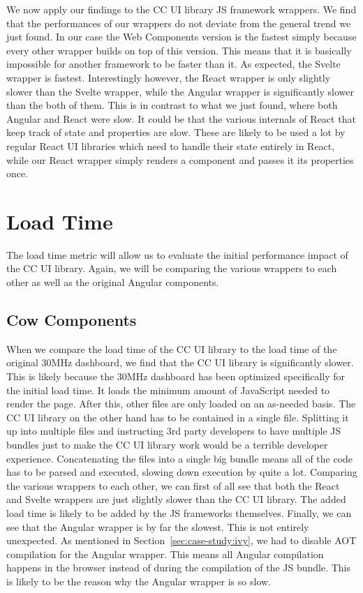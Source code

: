 We now apply our findings to the CC UI library JS framework wrappers. We find that the performances of our wrappers do not deviate from the general trend we just found. In our case the Web Components version is the fastest simply because every other wrapper builds on top of this version. This means that it is basically impossible for another framework to be faster than it. As expected, the Svelte wrapper is fastest. Interestingly however, the React wrapper is only slightly slower than the Svelte wrapper, while the Angular wrapper is significantly slower than the both of them. This is in contrast to what we just found, where both Angular and React were slow. It could be that the various internals of React that keep track of state and properties are slow. These are likely to be used a lot by regular React UI libraries which need to handle their state entirely in React, while our React wrapper simply renders a component and passes it its properties once.

\section{Load Time}
The load time metric will allow us to evaluate the initial performance impact of the CC UI library. Again, we will be comparing the various wrappers to each other as well as the original Angular components.

\subsection{Cow Components}
When we compare the load time of the CC UI library to the load time of the original 30MHz dashboard, we find that the CC UI library is significantly slower. This is likely because the 30MHz dashboard has been optimized specifically for the initial load time. It loads the minimum amount of JavaScript needed to render the page. After this, other files are only loaded on an as-needed basis. The CC UI library on the other hand has to be contained in a single file. Splitting it up into multiple files and instructing 3rd party developers to have multiple JS bundles just to make the CC UI library work would be a terrible developer experience. Concatenating the files into a single big bundle means all of the code has to be parsed and executed, slowing down execution by quite a lot. Comparing the various wrappers to each other, we can first of all see that both the React and Svelte wrappers are just slightly slower than the CC UI library. The added load time is likely to be added by the JS frameworks themselves. Finally, we can see that the Angular wrapper is by far the slowest. This is not entirely unexpected. As mentioned in Section~\ref{sec:case-study:ivy}, we had to disable AOT compilation for the Angular wrapper. This means all Angular compilation happens in the browser instead of during the compilation of the JS bundle. This is likely to be the reason why the Angular wrapper is so slow.

